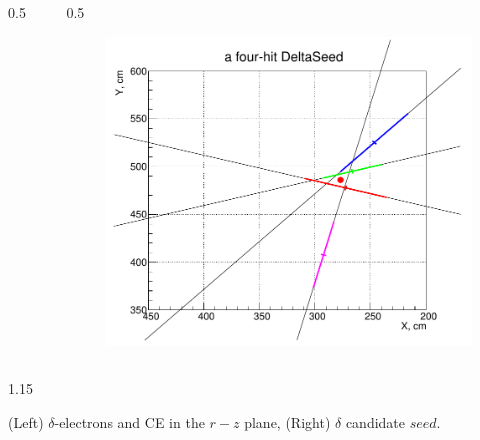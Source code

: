 \documentclass{beamer}
\begin{document}
\begin{frame}
\begin{columns}
\begin{column}{0.5\framewidth}
\begin{figure}[!h]
       \label{fig:momhits}
\end{figure}
        \end{column}
        \begin{column}{0.5\framewidth}
               \begin{figure}[!h]
        \centering
         \hspace*{-1em}
        \includegraphics[width =0.75\columnwidth]{figures/png/Screenshot_20240811_115854.png}
       \label{fig:momhits}
\end{figure}
        \end{column}
    \end{columns}
        \vspace{-2mm}
      \begin{columns}
        \begin{column}{1.15\framewidth}
    \setlength{\leftmargini}{1.2em}
    \begin{itemize}
    {\small   
    \item (Left) $\delta$-electrons and CE in the $r-z$ plane, (Right) $\delta$ candidate $seed$.}
    \end{itemize}
    \end{column}
    \end{columns}
\end{frame}
\end{document}
